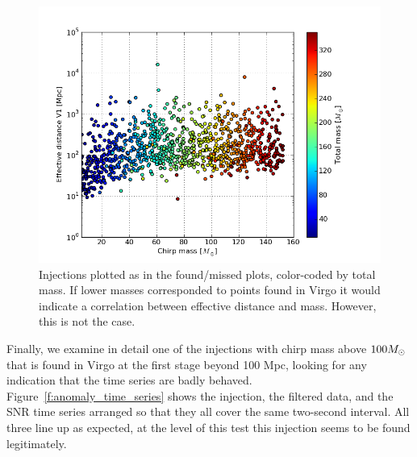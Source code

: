 \begin{figure}
  \includegraphics[width=\linewidth]{figures/ninja2_results/anomaly_masses}
  \caption[Injections color-coded by total mass]{
  \label{f:anomaly_masses}
Injections plotted as in the found/missed plots, color-coded by total
mass.  If lower masses corresponded to points found in Virgo it would 
indicate a correlation between effective distance and mass.  However, this
is not the case.
}
\end{figure}%

Finally, we examine in detail one of the injections with chirp mass
above $100 M_\odot$ that is found in Virgo at the first stage beyond 100
Mpc, looking for any indication that the time series are badly
behaved.  Figure~\ref{f:anomaly_time_series} shows the injection, the
filtered data, and the SNR time series arranged so that they all cover
the same two-second interval.  All three line up as expected, at the
level of this test this injection seems to be found legitimately.


